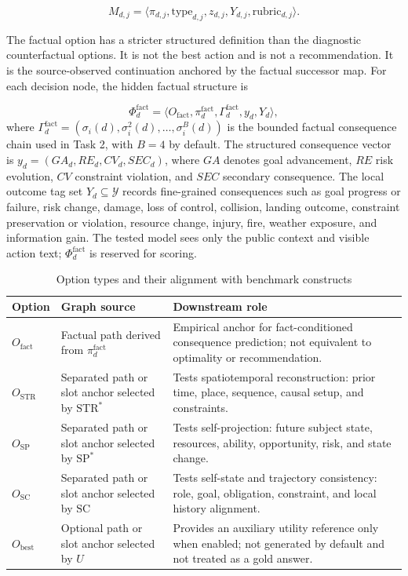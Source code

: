 \documentclass[pdflatex,sn-mathphys-num]{sn-jnl}%
\theoremstyle{thmstyleone}%
\theoremstyle{thmstyletwo}%
\theoremstyle{thmstylethree}%
\begin{document}
\begin{equation}
M_{d,j}=\langle \pi_{d,j},\mathrm{type}_{d,j},z_{d,j},Y_{d,j},\mathrm{rubric}_{d,j}\rangle.
\end{equation}

The factual option has a stricter structured definition than the diagnostic counterfactual options. It is not the best action and is not a recommendation. It is the source-observed continuation anchored by the factual successor map. For each decision node, the hidden factual structure is

\begin{equation}
\Phi_d^{\mathrm{fact}}=\langle O_{\mathrm{fact}},\pi_d^{\mathrm{fact}},\Gamma_d^{\mathrm{fact}},y_d,Y_d\rangle ,
\end{equation}
where $\Gamma_d^{\mathrm{fact}}=(\sigma_i(d),\sigma_i^2(d),\ldots,\sigma_i^B(d))$ is the bounded factual consequence chain used in Task 2, with $B=4$ by default. The structured consequence vector is $y_d=(GA_d,RE_d,CV_d,SEC_d)$, where $GA$ denotes goal advancement, $RE$ risk evolution, $CV$ constraint violation, and $SEC$ secondary consequence. The local outcome tag set $Y_d\subseteq\mathcal{Y}$ records fine-grained consequences such as goal progress or failure, risk change, damage, loss of control, collision, landing outcome, constraint preservation or violation, resource change, injury, fire, weather exposure, and information gain. The tested model sees only the public context and visible action text; $\Phi_d^{\mathrm{fact}}$ is reserved for scoring.

\begin{table}[htbp]
\centering
\small
\caption{Option types and their alignment with benchmark constructs}
\label{tab:option-types-and-constructs}
\begin{tabular}{p{}p{}p{}}
\toprule
Option & Graph source & Downstream role \\
\midrule
$O_{\mathrm{fact}}$ & Factual path derived from $\pi_d^{\mathrm{fact}}$ & Empirical anchor for fact-conditioned consequence prediction; not equivalent to optimality or recommendation. \\
$O_{\mathrm{STR}}$ & Separated path or slot anchor selected by $\mathrm{STR}^{*}$ & Tests spatiotemporal reconstruction: prior time, place, sequence, causal setup, and constraints. \\
$O_{\mathrm{SP}}$ & Separated path or slot anchor selected by $\mathrm{SP}^{*}$ & Tests self-projection: future subject state, resources, ability, opportunity, risk, and state change. \\
$O_{\mathrm{SC}}$ & Separated path or slot anchor selected by $\mathrm{SC}$ & Tests self-state and trajectory consistency: role, goal, obligation, constraint, and local history alignment. \\
$O_{\mathrm{best}}$ & Optional path or slot anchor selected by $U$ & Provides an auxiliary utility reference only when enabled; not generated by default and not treated as a gold answer. \\
\bottomrule
\end{tabular}
\end{table}
\end{document}

